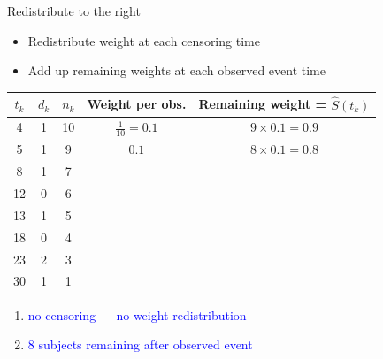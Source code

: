 \documentclass[10pt,t]{beamer}
\begin{document}
\begin{frame}{Redistribute to the right}
	
	\vspace{-5 mm}
	
	
	\begin{itemize}
		\item Redistribute weight at each censoring time
		
		\medskip
		
		\item Add up remaining weights at each observed event time
		
		\smallskip
		
	\end{itemize}
	\begin{footnotesize}
		\begin{center}
		\begin{tabular}{|c|c|c|c|c|}
			\hline
			$t_k$ & $d_k$ & $n_k$ & Weight per obs. & Remaining weight = $\widehat{S}(t_k)$ \\
			\hline
			4 & 1 & 10 & $\frac{1}{10} = 0.1$ & $9\times 0.1= 0.9$\\
			5 & 1 & 9 & $0.1$ &  $8\times 0.1= 0.8$  \\
			8 & 1 & 7 & & \\
			12 & 0 & 6 & & \\
			13 & 1 & 5 & & \\
			18 & 0 & 4 & & \\
			23 & 2 & 3 & & \\
			30 & 1 & 1 & & \\
			\hline
		\end{tabular}
	\end{center}
	\end{footnotesize}

\medskip

	\begin{enumerate}
		\item \textcolor{blue}{no censoring --- no weight redistribution}
		
		\medskip
		
		\item \textcolor{blue}{8 subjects remaining after observed event}
	\end{enumerate}
\end{frame}
\end{document}
